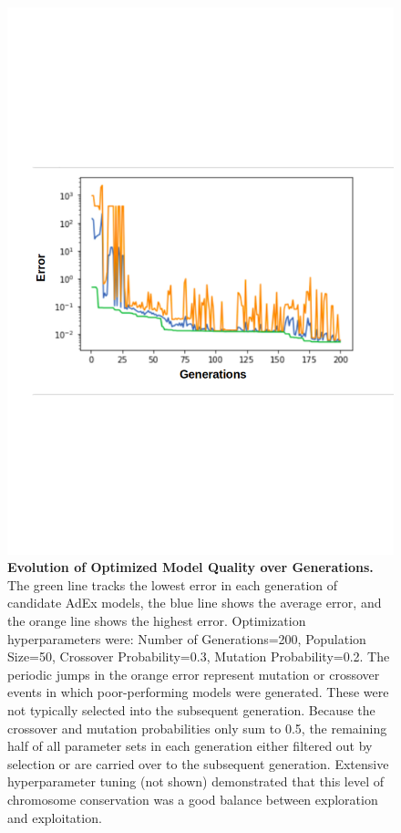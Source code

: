  
\begin{figure}
    \centering
    \includegraphics[scale=1]{figures/optimizer_internal_validation_annotated_yticks4.png}
    \caption[Optimizer Error over Generations]{\textbf{Evolution of Optimized Model Quality over Generations.}
    The green line tracks the lowest error in each generation of candidate AdEx models, the blue line shows the average error, and the orange line shows the highest error.
    Optimization hyperparameters were: Number of Generations=200, Population Size=50, Crossover Probability=0.3, Mutation Probability=0.2.
    The periodic jumps in the orange error represent mutation or crossover events in which poor-performing models were generated.
    These were not typically selected into the subsequent generation.
    Because the crossover and mutation probabilities only sum to 0.5, the remaining half of all parameter sets in each generation either filtered out by selection or are carried over to the subsequent generation.
    Extensive hyperparameter tuning (not shown) demonstrated that this level of chromosome conservation was a good balance between exploration and exploitation.}
    \label{fig:optimizer-evolution}
\end{figure}

